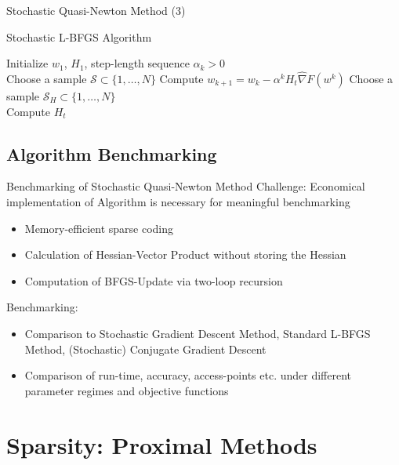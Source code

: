 \documentclass[11pt]{beamer}
\begin{document}
	\begin{frame}{Stochastic Quasi-Newton Method (3)}
		\begin{block}{Stochastic L-BFGS Algorithm}
			\begin{algorithm}[H]
				\begin{algorithmic}[1]
					\STATE Initialize $w_1$, $H_1$, step-length sequence $\alpha_k > 0$ \\
					\STATE Choose a sample $\mathcal{S} \subset \{1, \dots, N\}$
					\STATE Compute $w_{k+1} = w_k - \alpha^k H_t \widehat{\nabla}F(w^k)$
					\STATE Choose a sample $\mathcal{S}_H \subset \{1, \dots, N\}$ \\
					\STATE Compute $H_t$ \\
					\ENDIF
					\ENDFOR
				\end{algorithmic}
			\end{algorithm}
		\end{block}
	\end{frame}
	
	\subsection{Algorithm Benchmarking}
	
	\begin{frame}{Benchmarking of Stochastic Quasi-Newton Method}
		Challenge: Economical implementation of Algorithm is necessary for meaningful 
		benchmarking
		\begin{itemize}
			\item Memory-efficient sparse coding
			\item Calculation of Hessian-Vector Product without storing the Hessian
			\item Computation of BFGS-Update via two-loop recursion
		\end{itemize}
		\vspace{0.3cm}
		\pause
		Benchmarking:
		\begin{itemize}
			\item Comparison to Stochastic Gradient Descent Method, Standard L-BFGS Method, 
			(Stochastic) Conjugate Gradient Descent
			\item Comparison of run-time, accuracy, access-points etc. under different parameter 
			regimes and objective functions
		\end{itemize}
	\end{frame}
	
	
	\section{Sparsity: Proximal Methods}
\end{document}
